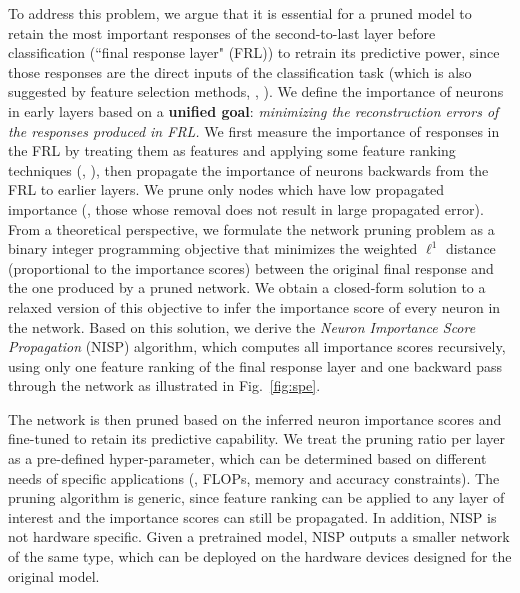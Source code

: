 \documentclass[10pt,twocolumn,letterpaper]{article}
\begin{document}
To address this problem, we argue that it is essential for a pruned model to retain the most important responses of the second-to-last layer before classification (``final response layer" (FRL)) to retrain its predictive power, since those responses are the direct inputs of the classification task (which is also suggested by feature selection methods, \eg, \cite{Roffo_2015_ICCV}). We define the importance of neurons in early layers based on a \textbf{unified goal}: \emph{minimizing the reconstruction errors of the responses produced in FRL.} 
We first measure the importance of responses in the FRL by treating them as features and applying some feature ranking techniques (\eg, \cite{Roffo_2015_ICCV}), then propagate the importance of neurons backwards from the FRL to earlier layers. We prune only nodes which have low propagated importance (\ie, those whose removal does not result in large propagated error).  From a theoretical perspective, we formulate the network pruning problem as a binary integer programming objective that minimizes the weighted $\ell^1$ distance (proportional to the importance scores) between the original final response and the one produced by a pruned network. 
We obtain a closed-form solution to a relaxed version of this objective to infer the importance score of every neuron in the network. 
Based on this solution, we derive the \textit{Neuron Importance Score Propagation} (NISP) algorithm, which computes all importance scores recursively, using only one feature ranking of the final response layer and one backward pass through the network as illustrated in Fig.~\ref{fig:spe}.

The network is then pruned based on the inferred neuron
importance scores and fine-tuned to retain its predictive capability.
We treat the pruning ratio per layer as a pre-defined hyper-parameter, which can be determined based on different needs of specific applications (\eg, FLOPs, memory and accuracy constraints). The pruning algorithm is generic, since feature ranking can be applied to any layer of interest and the importance scores can still be propagated. In addition, NISP is not hardware specific. Given a pretrained model, NISP outputs a smaller network of the same type, which can be deployed on the hardware devices designed for the original model.
\end{document}
